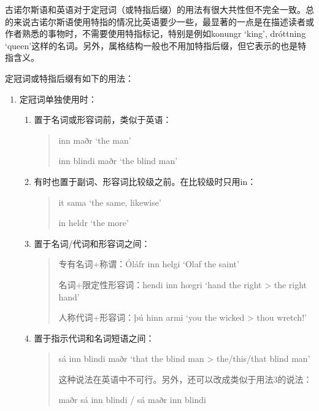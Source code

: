 古诺尔斯语和英语对于定冠词（或特指后缀）的用法有很大共性但不完全一致。总的来说古诺尔斯语使用特指的情况比英语要少一些，最显著的一点是在描述读者或作者熟悉的事物时，不需要使用特指标记，特别是例如konungr
`king', dróttning
`queen'这样的名词。另外，属格结构一般也不用加特指后缀，但它表示的也是特指含义。

定冠词或特指后缀有如下的用法：

\begin{enumerate}
  \item 定冠词单独使用时：
        \begin{enumerate}
          \item 置于名词或形容词前，类似于英语：
                \begin{quote}
                  inn maðr `the man'

                  inn blindi maðr `the blind man'
                \end{quote}

          \item 有时也置于副词、形容词比较级之前。在比较级时只用in：
                \begin{quote}
                  it sama `the same, likewise'

                  in heldr `the more'
                \end{quote}

          \item 置于名词/代词和形容词之间：
                \begin{quote}
                  专有名词+称谓：Óláfr inn helgi `Olaf the saint'

                  名词+限定性形容词：hendi inn hœgri `hand the right \textgreater{} the
                  right hand'

                  人称代词+形容词：þú hinn armi `you the wicked \textgreater{} thou
                  wretch!'
                \end{quote}

          \item 置于指示代词和名词短语之间：
                \begin{quote}
                  sá inn blindi maðr `that the blind man \textgreater{} the/this/that
                  blind man'

                  这种说法在英语中不可行。另外，还可以改成类似于用法3的说法：

                  maðr sá inn blindi / sá maðr inn blindi
                \end{quote}


\end{enumerate}
\end{enumerate}
